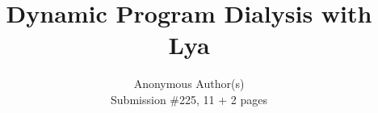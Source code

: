 \documentclass[letterpaper,twocolumn,10pt]{article}
\begin{document}

\date{}

\title{\Large \bf Dynamic Program Dialysis with Lya}

\author{
{\rm Anonymous Author(s)}\\
\normalsize{Submission \#225, 11 + 2 pages}\\
}

\maketitle
\end{document}
